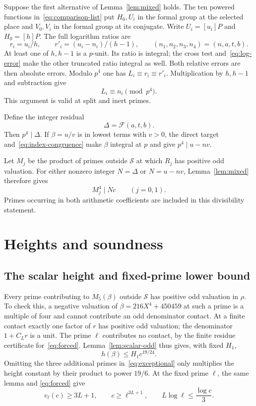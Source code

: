 \documentclass[11pt,a4paper]{article}
\begin{document}
Suppose the first alternative of Lemma~\ref{lem:mixed} holds.
The ten powered functions in~\eqref{eq:comparison-list} put
$H_0,U_i$ in the formal group at the selected place and $V_0,V_i$
in the formal group at its conjugate. Write $U_i=[u_i]P$ and
$H_0=[h]P$. The full logarithm ratios are
\[
 r_i=u_i/h,\qquad r'_i=(u_i-n_i)/(h-1),
 \qquad (n_1,n_2,n_3,n_4)=(n,a,t,b).
\]
At least one of $h,h-1$ is a $p$-unit. Its ratio is integral;
the cross test and~\eqref{eq:log-error} make the other truncated
ratio integral as well. Both relative errors are then absolute
errors. Modulo $p^4$ one has $L_i\equiv r_i\equiv r'_i$.
Multiplication by $h,h-1$ and subtraction give
\begin{equation}\label{eq:index-congruence}
 L_i\equiv n_i\pmod{p^4}.
\end{equation}
This argument is valid at split and inert primes.

Define the integer residual
\[
 \Delta=\mathcal F(a,t,b).
\]
Then $p^4\mid\Delta$. If $\beta=u/v$ is in lowest terms
with $v>0$, the direct target and~\eqref{eq:index-congruence}
make $\beta$ integral at $p$ and give
$p^4\mid u-nv$.

Let $M_j$ be the product of primes outside $\mathcal S$ at which
$R_j$ has positive odd valuation. For either nonzero integer
$N=\Delta$ or $N=u-nv$, Lemma~\ref{lem:mixed} therefore gives
\begin{equation}\label{eq:residual-divisibility}
                         M_j^4\mid Nc\qquad(j=0,1).
\end{equation}
Primes occurring in both arithmetic coefficients are included in this
divisibility statement.

\section{Heights and soundness}

\subsection{The scalar height and fixed-prime lower bound}

Every prime contributing to $M_5(\beta)$ outside $\mathcal S$
has positive odd valuation in $\rho$. To check this, a negative
valuation of $\beta=216X^4+450459$ at such a prime is a multiple
of four and cannot contribute an odd denominator contact. At a
finite contact exactly one factor of $r$ has positive odd valuation;
the denominator $1+C_Lr$ is a unit. The prime $\ell$ contributes
no contact, by the finite residue certificate for~\eqref{eq:forced}.
Lemma~\ref{lem:scalar-odd} thus gives, with fixed $H_1$,
\begin{equation}\label{eq:scalar-height}
 h(\beta)\le H_1c^{19/24}.
\end{equation}
Omitting the three additional primes in~\eqref{eq:exceptional}
only multiplies the height constant by their product to power
$19/6$. At the fixed prime $\ell$, the same lemma and
\eqref{eq:forced} give
\begin{equation}\label{eq:c-large}
 v_\ell(c)\ge3L+1,\qquad
 c\ge\ell^{3L+1},\qquad L\log\ell\le\frac{\log c}{3}.
\end{equation}
\end{document}
